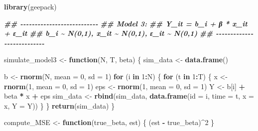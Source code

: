 \documentclass[
]{article}
\newenvironment{Shaded}{\begin{snugshade}}{\end{snugshade}}
\newcommand{\AttributeTok}[1]{\textcolor[rgb]{0.13,0.29,0.53}{#1}}
\newcommand{\ControlFlowTok}[1]{\textcolor[rgb]{0.13,0.29,0.53}{\textbf{#1}}}
\newcommand{\DecValTok}[1]{\textcolor[rgb]{0.00,0.00,0.81}{#1}}
\newcommand{\DocumentationTok}[1]{\textcolor[rgb]{0.56,0.35,0.01}{\textbf{\textit{#1}}}}
\newcommand{\FunctionTok}[1]{\textcolor[rgb]{0.13,0.29,0.53}{\textbf{#1}}}
\newcommand{\NormalTok}[1]{#1}
\newcommand{\OtherTok}[1]{\textcolor[rgb]{0.56,0.35,0.01}{#1}}
\newcommand{\SpecialCharTok}[1]{\textcolor[rgb]{0.81,0.36,0.00}{\textbf{#1}}}
\begin{document}
\begin{Shaded}
\begin{Highlighting}[]
\FunctionTok{library}\NormalTok{(geepack)}

\DocumentationTok{\#\# {-}{-}{-}{-}{-}{-}{-}{-}{-}{-}{-}{-}{-}{-}{-}{-}{-}{-}{-}{-}{-}{-}{-}{-}{-}{-}{-}}
\DocumentationTok{\#\# Model 3:}
\DocumentationTok{\#\# Y\_it = b\_i + β * x\_it + ε\_it}
\DocumentationTok{\#\# b\_i \textasciitilde{} N(0,1), x\_it \textasciitilde{} N(0,1), ε\_it \textasciitilde{} N(0,1)}
\DocumentationTok{\#\# {-}{-}{-}{-}{-}{-}{-}{-}{-}{-}{-}{-}{-}{-}{-}{-}{-}{-}{-}{-}{-}{-}{-}{-}{-}{-}{-}}

\NormalTok{simulate\_model3 }\OtherTok{\textless{}{-}} \ControlFlowTok{function}\NormalTok{(N, T, beta) \{}
\NormalTok{  sim\_data }\OtherTok{\textless{}{-}} \FunctionTok{data.frame}\NormalTok{()}
  
\NormalTok{  b }\OtherTok{\textless{}{-}} \FunctionTok{rnorm}\NormalTok{(N, }\AttributeTok{mean =} \DecValTok{0}\NormalTok{, }\AttributeTok{sd =} \DecValTok{1}\NormalTok{)}
  \ControlFlowTok{for}\NormalTok{ (i }\ControlFlowTok{in} \DecValTok{1}\SpecialCharTok{:}\NormalTok{N) \{}
    \ControlFlowTok{for}\NormalTok{ (t }\ControlFlowTok{in} \DecValTok{1}\SpecialCharTok{:}\NormalTok{T) \{}
\NormalTok{      x }\OtherTok{\textless{}{-}} \FunctionTok{rnorm}\NormalTok{(}\DecValTok{1}\NormalTok{, }\AttributeTok{mean =} \DecValTok{0}\NormalTok{, }\AttributeTok{sd =} \DecValTok{1}\NormalTok{)}
\NormalTok{      eps }\OtherTok{\textless{}{-}} \FunctionTok{rnorm}\NormalTok{(}\DecValTok{1}\NormalTok{, }\AttributeTok{mean =} \DecValTok{0}\NormalTok{, }\AttributeTok{sd =} \DecValTok{1}\NormalTok{)}
\NormalTok{      Y }\OtherTok{\textless{}{-}}\NormalTok{ b[i] }\SpecialCharTok{+}\NormalTok{ beta }\SpecialCharTok{*}\NormalTok{ x }\SpecialCharTok{+}\NormalTok{ eps}
\NormalTok{      sim\_data }\OtherTok{\textless{}{-}} \FunctionTok{rbind}\NormalTok{(sim\_data, }\FunctionTok{data.frame}\NormalTok{(}\AttributeTok{id =}\NormalTok{ i, }\AttributeTok{time =}\NormalTok{ t, }\AttributeTok{x =}\NormalTok{ x, }\AttributeTok{Y =}\NormalTok{ Y))}
\NormalTok{    \}}
\NormalTok{  \}}
  \FunctionTok{return}\NormalTok{(sim\_data)}
\NormalTok{\}}

\NormalTok{compute\_MSE }\OtherTok{\textless{}{-}} \ControlFlowTok{function}\NormalTok{(true\_beta, est) \{}
\NormalTok{  (est }\SpecialCharTok{{-}}\NormalTok{ true\_beta)}\SpecialCharTok{\^{}}\DecValTok{2}
\NormalTok{\}}


\end{Highlighting}
\end{Shaded}
\end{document}
